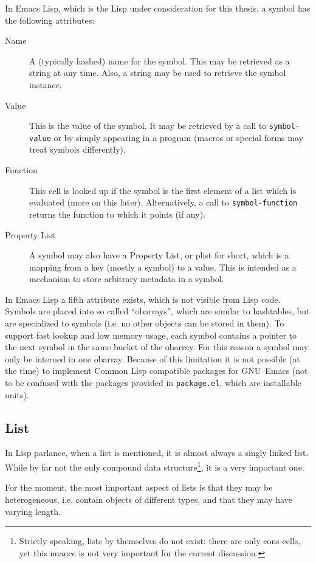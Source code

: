 \documentclass[a4paper,10pt,twoside]{report}
\newcommand{\el}{Emacs Lisp}
\newcommand{\cl}{Common Lisp}
\newcommand{\fun}[1]{\texttt{#1}}
\newcommand{\emacs}{GNU~Emacs}
\begin{document}
In \el{}, which is the Lisp under consideration for this thesis, a symbol has
the following attributes:

\begin{description}
\item[{Name}] A (typically hashed) name for the symbol.  This may be retrieved
  as a string at any time.  Also, a string may be used to retrieve the symbol
  instance.
\item[{Value}] This is the value of the symbol.  It may be retrieved by a call
  to \fun{symbol-value} or by simply appearing in a program (macros or special
  forms may treat symbols differently).
\item[{Function}] This cell is looked up if the symbol is the first element of a
  list which is evaluated (more on this later).  Alternatively, a call to
  \fun{symbol-function} returns the function to which it points (if any).
\item[{Property List}] A symbol may also have a Property List, or plist for
  short, which is a mapping from a key (mostly a symbol) to a value.  This is
  intended as a mechanism to store arbitrary metadata in a symbol.
\end{description}

In \el{} a fifth attribute exists, which is not visible from Lisp code.  Symbols
are placed into so called ``obarrays'', which are similar to hashtables, but are
specialized to symbols (i.e. no other objects can be stored in them).  To
support fast lookup and low memory usage, each symbol contains a pointer to the
next symbol in the same bucket of the obarray.  For this reason a symbol may
only be interned in one obarray.  Because of this limitation it is not possible
(at the time) to implement \cl{} compatible packages for \emacs{} (not to be
confused with the packages provided in \fun{package.el}, which are installable
units).

\subsection{List}
\label{subsubsec:list}

In Lisp parlance, when a list is mentioned, it is almost always a singly linked
list.  While by far not the only compound data structure\footnote{Strictly
  speaking, lists by themselves do not exist: there are only cons-cells, yet
  this nuance is not very important for the current discussion.}, it is a very
important one.

For the moment, the most important aspect of lists is that they may be
heterogeneous, i.e. contain objects of different types, and that they may have
varying length.
\end{document}
